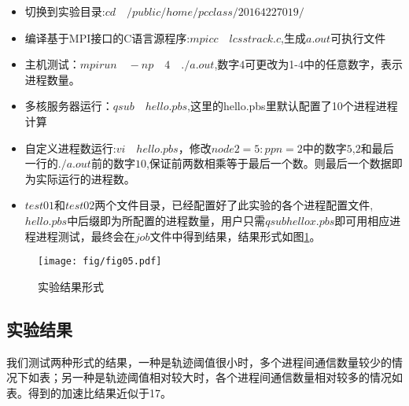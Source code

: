 \documentclass[UTF8]{ctexart}
\begin{document}
\begin{itemize}
	\item 切换到实验目录:$cd \quad /public/home/pcclass/20164227019/$
	\item 编译基于MPI接口的C语言源程序:$mpicc \quad lcsstrack.c$,生成$a.out$可执行文件
	\item 主机测试：$mpirun \quad -np \quad 4 \quad ./a.out$,数字$4$可更改为1-4中的任意数字，表示进程数量。
	\item 多核服务器运行：$qsub \quad hello.pbs$,这里的hello.pbs里默认配置了10个进程进程计算
	\item 自定义进程数运行:$vi \quad hello.pbs$，修改$node2=5:ppn=2$中的数字$5$,$2$和最后一行的$./a.out$前的数字$10$,保证前两数相乘等于最后一个数。则最后一个数据即为实际运行的进程数。
	\item $test01$和$test02$两个文件目录，已经配置好了此实验的各个进程配置文件,$hello.pbs$中后缀即为所配置的进程数量，用户只需$qsub hellox.pbs$即可用相应进程进程测试，最终会在$job$文件中得到结果，结果形式如图\ref{sec4:subsec2:fg1}。
\end{itemize}

\begin{figure}[!htbp]
  \centering
  \texttt{[image: fig/fig05.pdf]}\\
  \caption{实验结果形式}
  \label{sec4:subsec2:fg1}
\end{figure}

\subsection{实验结果}
\label{sec4:subsec3}

我们测试两种形式的结果，一种是轨迹阈值很小时，多个进程间通信数量较少的情况下如表；另一种是轨迹阈值相对较大时，各个进程间通信数量相对较多的情况如表。得到的加速比结果近似于17。
\end{document}
